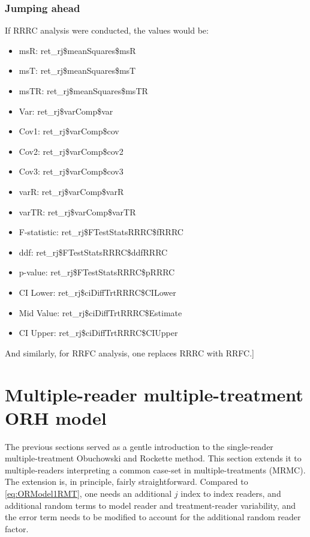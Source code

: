 \documentclass[
]{book}
\providecommand{\tightlist}{%
  \setlength{\itemsep}{0pt}\setlength{\parskip}{0pt}}
\begin{document}
\hypertarget{jumping-ahead}{%
\subsubsection{Jumping ahead}\label{jumping-ahead}}

If RRRC analysis were conducted, the values would be:

\begin{itemize}
\tightlist
\item
  msR: ret\_rj\$meanSquares\$msR
\item
  msT: ret\_rj\$meanSquares\$msT
\item
  msTR: ret\_rj\$meanSquares\$msTR
\item
  Var: ret\_rj\$varComp\$var
\item
  Cov1: ret\_rj\$varComp\$cov
\item
  Cov2: ret\_rj\$varComp\$cov2
\item
  Cov3: ret\_rj\$varComp\$cov3
\item
  varR: ret\_rj\$varComp\$varR
\item
  varTR: ret\_rj\$varComp\$varTR
\item
  F-statistic: ret\_rj\$FTestStatsRRRC\$fRRRC
\item
  ddf: ret\_rj\$FTestStatsRRRC\$ddfRRRC
\item
  p-value: ret\_rj\$FTestStatsRRRC\$pRRRC
\item
  CI Lower: ret\_rj\$ciDiffTrtRRRC\$CILower
\item
  Mid Value: ret\_rj\$ciDiffTrtRRRC\$Estimate
\item
  CI Upper: ret\_rj\$ciDiffTrtRRRC\$CIUpper
\end{itemize}

And similarly, for RRFC analysis, one replaces RRRC with RRFC.{]}

\hypertarget{multiple-reader-multiple-treatment-orh-model}{%
\section{Multiple-reader multiple-treatment ORH model}\label{multiple-reader-multiple-treatment-orh-model}}

The previous sections served as a gentle introduction to the single-reader multiple-treatment Obuchowski and Rockette method. This section extends it to multiple-readers interpreting a common case-set in multiple-treatments (MRMC). The extension is, in principle, fairly straightforward. Compared to \eqref{eq:ORModel1RMT}, one needs an additional \(j\) index to index readers, and additional random terms to model reader and treatment-reader variability, and the error term needs to be modified to account for the additional random reader factor.
\end{document}
